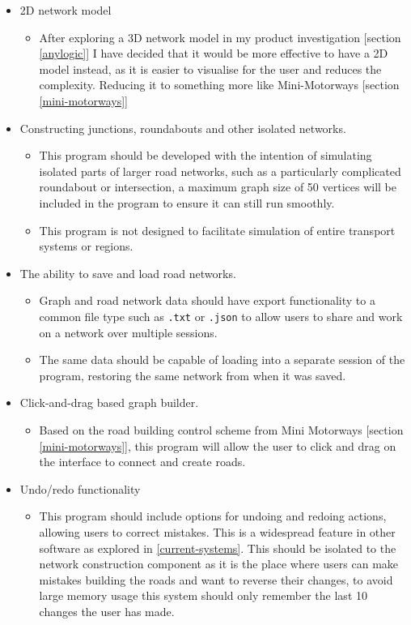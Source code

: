     \begin{itemize}
        \item 2D network model
        \begin{itemize}
            \item After exploring a 3D network model in my product investigation [section \ref{anylogic}] I have decided that it would be more effective to have a 2D model instead, as it is easier to visualise for the user and reduces the complexity. Reducing it to something more like Mini-Motorways [section \ref{mini-motorways}]
        \end{itemize}
        \item Constructing junctions, roundabouts and other isolated networks.
        \begin{itemize}
            \item This program should be developed with the intention of simulating isolated parts of larger road networks, such as a particularly complicated roundabout or intersection, a maximum graph size of 50 vertices will be included in the program to ensure it can still run smoothly.
            \item This program is not designed to facilitate simulation of entire transport systems or regions.
        \end{itemize}
        \item The ability to save and load road networks.
        \begin{itemize}
            \item Graph and road network data should have export functionality to a common file type such as \texttt{.txt} or \texttt{.json} to allow users to share and work on a network over multiple sessions.
            \item The same data should be capable of loading into a separate session of the program, restoring the same network from when it was saved.
        \end{itemize}
        \item Click-and-drag based graph builder.
        \begin{itemize}
            \item Based on the road building control scheme from Mini Motorways [section \ref{mini-motorways}], this program will allow the user to click and drag on the interface to connect and create roads.
        \end{itemize}
        \item Undo/redo functionality
        \begin{itemize}
            \item This program should include options for undoing and redoing actions, allowing users to correct mistakes. This is a widespread feature in other software as explored in \autoref{current-systems}. This should be isolated to the network construction component as it is the place where users can make mistakes building the roads and want to reverse their changes, to avoid large memory usage this system should only remember the last 10 changes the user has made.
        \end{itemize}
    \end{itemize}

